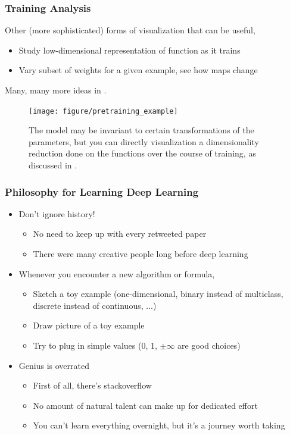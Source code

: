 \documentclass[10pt,mathserif]{beamer}
\begin{document}
\begin{frame}
  \frametitle{Training Analysis}
  Other (more sophisticated) forms of visualization that can be useful,
  \begin{itemize}
  \item Study low-dimensional representation of function as it trains
  \item Vary subset of weights for a given example, see how maps change
  \end{itemize}
  Many, many more ideas in \citep{bengio2012practical}.
\begin{figure}[ht]
  \centering
  \texttt{[image: figure/pretraining\_example]}
  \caption{The model may be invariant to certain transformations of the
    parameters, but you can directly visualization a dimensionality reduction
    done on the functions over the course of training, as discussed in
    \citep{erhan2010does}. \label{fig:pretraining_example} }
\end{figure}

\end{frame}

\begin{frame}
  \frametitle{Philosophy for Learning Deep Learning}
  \begin{itemize}
  \item Don't ignore history!
    \begin{itemize}
    \item No need to keep up with every retweeted paper
    \item There were many creative people long before deep learning
    \end{itemize}
  \item Whenever you encounter a new algorithm or formula,
    \begin{itemize}
    \item Sketch a toy example (one-dimensional, binary instead of multiclass,
      discrete instead of continuous, ...)
    \item Draw picture of a toy example
    \item Try to plug in simple values (0, 1, $\pm \infty$ are good choices)
    \end{itemize}
  \item Genius is overrated
    \begin{itemize}
    \item First of all, there's stackoverflow
    \item No amount of natural talent can make up for dedicated effort
    \item You can't learn everything overnight, but it's a journey worth taking
    \end{itemize}
  \end{itemize}
\end{frame}

\begin{frame}[allowframebreaks]
    
    
\end{frame}
\end{document}
